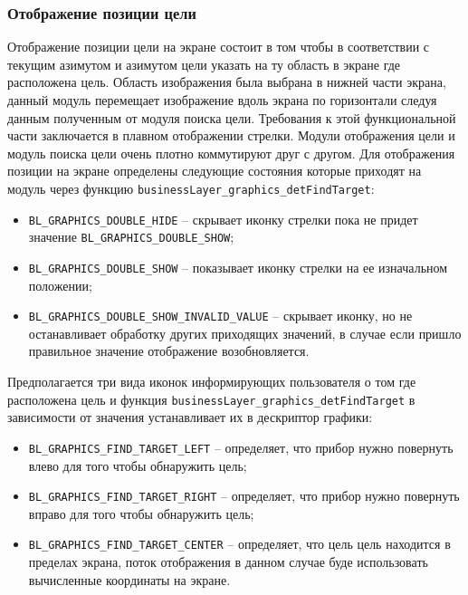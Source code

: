 \subsubsection{Отображение позиции цели}

Отображение позиции цели на экране состоит в том чтобы в соответствии с текущим азимутом и азимутом цели указать на ту область в экране где расположена цель.
Область изображения была выбрана в нижней части экрана, данный модуль перемещает изображение вдоль экрана по горизонтали следуя данным полученным от модуля поиска цели. Требования
к этой функциональной части заключается в плавном отображении стрелки. Модули отображения цели и модуль поиска цели очень плотно коммутируют друг с другом.
%
Для отображения позиции на экране определены следующие состояния которые приходят на модуль через функцию \lstinline{businessLayer_graphics_detFindTarget}:

\begin{itemize}
    \item \lstinline{BL_GRAPHICS_DOUBLE_HIDE} -- скрывает иконку стрелки пока не придет значение \lstinline{BL_GRAPHICS_DOUBLE_SHOW};
    \item \lstinline{BL_GRAPHICS_DOUBLE_SHOW} -- показывает иконку стрелки на ее изначальном положении;
    \item \lstinline{BL_GRAPHICS_DOUBLE_SHOW_INVALID_VALUE} -- скрывает иконку, но не останавливает обработку других приходящих значений, в случае если пришло правильное значение
    отображение возобновляется.
\end{itemize}

Предполагается три вида иконок информирующих пользователя о том где расположена цель и функция \lstinline{businessLayer_graphics_detFindTarget} в зависимости от значения устанавливает их
в дескриптор графики:

\begin{itemize}
    \item \lstinline{BL_GRAPHICS_FIND_TARGET_LEFT} -- определяет, что прибор нужно повернуть влево для того чтобы обнаружить цель;
    \item \lstinline{BL_GRAPHICS_FIND_TARGET_RIGHT} -- определяет, что прибор нужно повернуть вправо для того чтобы обнаружить цель; 
    \item \lstinline{BL_GRAPHICS_FIND_TARGET_CENTER} -- определяет, что цель цель находится в пределах экрана, поток отображения в данном случае буде использовать
    вычисленные координаты на экране.
\end{itemize}

